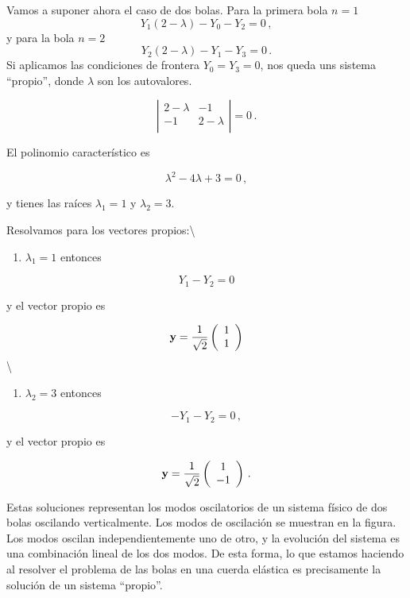 \documentclass[
]{agujournal2019}
\providecommand{\tightlist}{%
  \setlength{\itemsep}{0pt}\setlength{\parskip}{0pt}}\usepackage{longtable,booktabs,array}
\begin{document}
Vamos a suponer ahora el caso de dos bolas. Para la primera bola \(n=1\)
\[Y_1(2-\lambda)-Y_0-Y_2=0\,,\] y para la bola \(n=2\)
\[Y_2(2-\lambda)-Y_1-Y_3=0\,.\] Si aplicamos las condiciones de frontera
\(Y_0=Y_3=0\), nos queda uns sistema ``propio'', donde \(\lambda\) son
los autovalores.

\[\left|\begin{array}{cc}
  2-\lambda & -1 \\
   -1 & 2-\lambda\\
        \end{array}\right|=0\,.\]

El polinomio característico es

\[\lambda^2-4\lambda+3=0\,,\]

y tienes las raíces \(\lambda_1=1\) y \(\lambda_2=3\).

Resolvamos para los vectores propios:\textbackslash{}

\begin{enumerate}
\def\labelenumi{(\arabic{enumi})}
\tightlist
\item
  \(\lambda_1=1\) entonces
\end{enumerate}

\[Y_1-Y_2=0\]

y el vector propio es

\[{\textbf y}=\frac{1}{\sqrt{2}}\left(\begin{array}{c}
   1 \\
   1 \\
        \end{array}\right)\] \textbackslash{}

\begin{enumerate}
\def\labelenumi{(\arabic{enumi})}
\setcounter{enumi}{1}
\tightlist
\item
  \(\lambda_2=3\) entonces
\end{enumerate}

\[-Y_1-Y_2=0\,,\]

y el vector propio es

\[{\textbf y}=\frac{1}{\sqrt{2}}\left(\begin{array}{c}
   1 \\
   -1 \\
        \end{array}\right)\,.\]

Estas soluciones representan los modos oscilatorios de un sistema físico
de dos bolas oscilando verticalmente. Los modos de oscilación se
muestran en la figura. Los modos oscilan independientemente uno de otro,
y la evolución del sistema es una combinación lineal de los dos modos.
De esta forma, lo que estamos haciendo al resolver el problema de las
bolas en una cuerda elástica es precisamente la solución de un sistema
``propio''.
\end{document}
